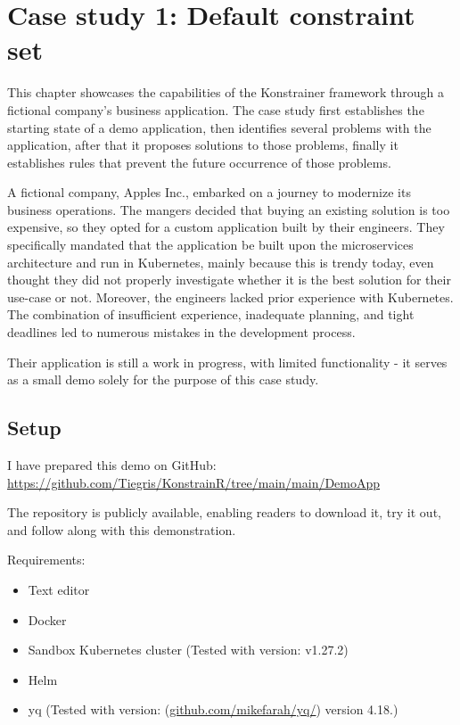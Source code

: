 \chapter{Case study 1: Default constraint set}
\label{chap:case_study1}

This chapter showcases the capabilities of the Konstrainer framework through a fictional company's business application. The case study first establishes the starting state of a demo application, then identifies several problems with the application, after that it proposes solutions to those problems, finally it establishes rules that prevent the future occurrence of those problems.

A fictional company, Apples Inc., embarked on a journey to modernize its business operations. The mangers decided that buying an existing solution is too expensive, so they opted for a custom application built by their engineers. They specifically mandated that the application be built upon the microservices architecture and run in Kubernetes, mainly because this is trendy today, even thought they did not properly investigate whether it is the best solution for their use-case or not. Moreover, the engineers lacked prior experience with Kubernetes. The combination of insufficient experience, inadequate planning, and tight deadlines led to numerous mistakes in the development process.

Their application is still a work in progress, with limited functionality - it serves as a small demo solely for the purpose of this case study.

\section{Setup}

I have prepared this demo on GitHub: \url{https://github.com/Tiegris/KonstrainR/tree/main/main/DemoApp}

The repository is publicly available, enabling readers to download it, try it out, and follow along with this demonstration. 

Requirements:

\begin{itemize}
    \item Text editor
    \item Docker
    \item Sandbox Kubernetes cluster (Tested with version: v1.27.2)
    \item Helm
    \item yq (Tested with version: (\url{github.com/mikefarah/yq/}) version 4.18.)
\end{itemize}


